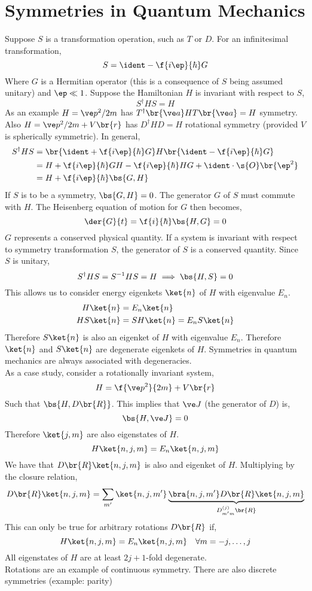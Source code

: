 \documentclass{article}
\begin{document}
\section{Symmetries in Quantum Mechanics}
Suppose $S$ is a transformation operation, such as $T$ or $D$. For an infinitesimal transformation,
\[ S = \ident - \f{i \ep}{\hbar} G \]
Where $G$ is a Hermitian operator (this is a consequence of $S$ being assumed unitary) and $\ep \ll 1$. Suppose the Hamiltonian $H$ is invariant with respect to $S$,
\[ S^{\dagger} H S = H \]
As an example $H = \ve p^2 / 2m$ has $T^{\dagger} \br{\ve a} H T \br{\ve a} = H$ symmetry. Also $H = \ve p^2 / 2m + V\br{r}$ has $D^{\dagger} H D = H$ rotational symmetry (provided $V$ is spherically symmetric). In general,
\begin{align*}
    S^{\dagger} H S
    &= \br{\ident + \f{i \ep}{\hbar} G} H \br{\ident - \f{i \ep}{\hbar} G} \\
    &= H + \f{i\ep}{\hbar} GH - \f{i\ep}{\hbar} HG + \ident \cdot \s{O}\br{\ep^2} \\
    &= H + \f{i\ep}{\hbar} \bs{G, H}
\end{align*}
If $S$ is to be a symmetry, $\bs{G, H} = 0$. The generator $G$ of $S$ must commute with $H$. The Heisenberg equation of motion for $G$ then becomes,
\[ \der{G}{t} = \f{i}{\hbar} \bs{H,G} = 0 \]
$G$ represents a conserved physical quantity. If a system is invariant with respect to symmetry transformation $S$, the generator of $S$ is a conserved quantity. Since $S$ is unitary,
\[ S^{\dagger} H S = S^{-1} H S = H \implies \bs{H,S}=0 \]
This allows us to consider energy eigenkets $\ket{n}$ of $H$ with eigenvalue $E_n$.
\begin{align*}
    H\ket{n} &= E_n \ket{n} \\
    HS\ket{n} &= S H\ket{n} = E_n S\ket{n}
\end{align*}
Therefore $S\ket{n}$ is also an eigenket of $H$ with eigenvalue $E_n$. Therefore $\ket{n}$ and $S\ket{n}$ are degenerate eigenkets of $H$. Symmetries in quantum mechanics are always associated with degeneracies. \\

As a case study, consider a rotationally invariant system,
\[ H = \f{\ve p^2}{2m} + V\br{r} \]
Such that $\bs{H, D\br{R}}$. This implies that $\ve J$ (the generator of $D$) is,
\[ \bs{H, \ve J} = 0 \]
Therefore $\ket{j,m}$ are also eigenstates of $H$.
\[ H\ket{n,j,m} = E_n \ket{n,j,m} \]
We have that $D\br{R} \ket{n,j,m}$ is also and eigenket of $H$. Multiplying by the closure relation,
\[ D\br{R}\ket{n,j,m} = \sum_{m'}\ket{n,j,m'}\underbrace{\bra{n,j,m'}D\br{R}\ket{n,j,m}}_{D^{(j)}_{m'm}\br{R}} \]
This can only be true for arbitrary rotations $D\br{R}$ if,
\[ H \ket{n,j,m} = E_n \ket{n,j,m} \quad \forall m = -j, \ldots, j\]
All eigenstates of $H$ are at least $2j+1$-fold degenerate.\\

Rotations are an example of continuous symmetry. There are also discrete symmetries (example: parity)
\end{document}
